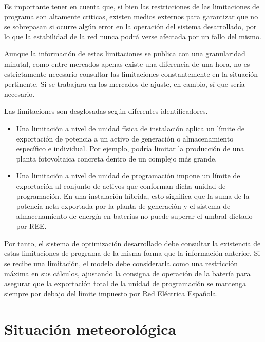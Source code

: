 Es importante tener en cuenta que, si bien las restricciones de las limitaciones de programa son altamente criticas, existen medios externos para garantizar que no se sobrepasan si ocurre algún error en la operación del sistema desarrollado, por lo que la estabilidad de la red nunca podrá verse afectada por un fallo del mismo.

Aunque la información de estas limitaciones se publica con una granularidad minutal, como entre mercados apenas existe una diferencia de una hora, no es estrictamente necesario consultar las limitaciones constantemente en la situación pertinente. Si se trabajara en los mercados de ajuste, en cambio, sí que sería necesario.

Las limitaciones son desglosadas según diferentes identificadores.

\begin{itemize}

\item Una limitación a nivel de unidad física de instalación aplica un límite de exportación de potencia a un activo de generación o almacenamiento específico e individual. Por ejemplo, podría limitar la producción de una planta fotovoltaica concreta dentro de un complejo más grande.
      
\item Una limitación a nivel de unidad de programación impone un límite de exportación al conjunto de activos que conforman dicha unidad de programación. En una instalación híbrida, esto significa que la suma de la potencia neta exportada por la planta de generación y el sistema de almacenamiento de energía en baterías no puede superar el umbral dictado por REE.

\end{itemize}

Por tanto, el sistema de optimización desarrollado debe consultar la existencia de estas limitaciones de programa de la misma forma que la información anterior. Si se recibe una limitación, el modelo debe considerarla como una restricción máxima en sus cálculos, ajustando la consigna de operación de la batería para asegurar que la exportación total de la unidad de programación se mantenga siempre por debajo del límite impuesto por Red Eléctrica Española.

\section{Situación meteorológica}
\label{makereference4.3}

